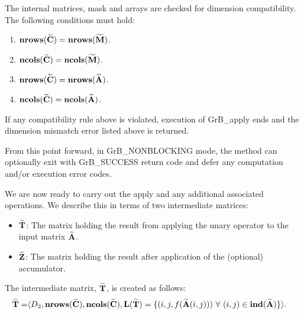 The internal matrices, mask and arrays are checked for dimension compatibility. 
The following conditions must hold:
\begin{enumerate}
	\item $\bold{nrows}({\bf \widetilde{C}}) = \bold{nrows}({\bf \widetilde{M}})$.

	\item $\bold{ncols}({\bf \widetilde{C}}) = \bold{ncols}({\bf \widetilde{M}})$.

	\item $\bold{nrows}({\bf \widetilde{C}}) = \bold{nrows}({\bf \widetilde{A}})$.

	\item $\bold{ncols}({\bf \widetilde{C}}) = \bold{ncols}({\bf \widetilde{A}})$.
\end{enumerate}
If any compatibility rule above is violated, execution of {\sf GrB\_apply} ends 
and the dimension mismatch error listed above is returned.

From this point forward, in {\sf GrB\_NONBLOCKING} mode, the method can optionally exit
with {\sf GrB\_SUCCESS} return code and defer any computation and/or execution error codes.

We are now ready to carry out the apply and any additional 
associated operations.  We describe this in terms of two intermediate matrices:
\begin{itemize}
    \item ${\bf \widetilde{T}}$: The matrix holding the result from applying the unary operator to the input matrix
    ${\bf \widetilde{A}}$.
    
    \item ${\bf \widetilde{Z}}$: The matrix holding the result after 
    application of the (optional) accumulator.
\end{itemize}

The intermediate matrix, ${\bf \widetilde{T}}$, is created as follows:
\[
\begin{aligned}
{\bf \widetilde{T}} = & \langle D_2,
                           \bold{nrows}({\bf \widetilde{C}}), 
                           \bold{ncols}({\bf \widetilde{C}}),  \bold{L}({\bf \widetilde{T}}) =
	\{(i,j,f({\bf \widetilde{A}}(i,j))) 
\ \forall \ (i,j) \in 
\bold{ind}({\bf \widetilde{A}}) \} \rangle.
\end{aligned}
\]

